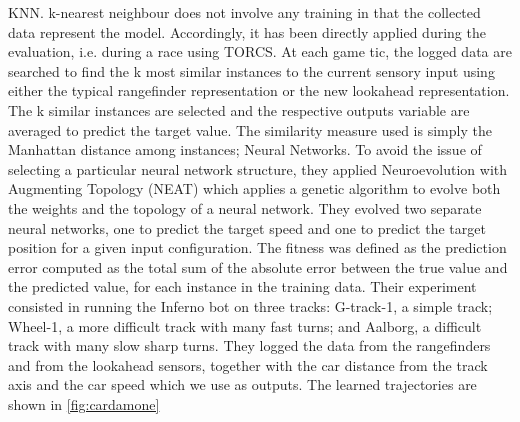 KNN. k-nearest neighbour does not involve any training in that
the collected data represent the model. Accordingly, it has been directly applied during the evaluation, i.e. during a race using TORCS. At each game tic, the logged data are searched to find the k most similar instances to the current sensory input using either the typical rangefinder representation or the new lookahead representation. The k similar instances are selected and the respective outputs variable are averaged to predict the target value. The similarity measure used is simply the Manhattan distance among instances;
Neural Networks. To avoid the issue of selecting a particular neural network structure, they applied Neuroevolution with Augmenting Topology (NEAT) \cite{neat} which applies a genetic algorithm to evolve both the weights and the topology of a neural network. They evolved two separate neural networks, one to predict the target speed and one to predict the target position for a given input configuration. The fitness was defined as the prediction error computed as the total sum of the absolute error between the true value and the predicted value, for each instance in the training data. 
Their experiment consisted in running the Inferno bot on three tracks: G-track-1, a simple track; Wheel-1, a more difficult track with many fast turns; and Aalborg, a difficult track with many slow sharp turns. They logged the data from the rangefinders and from the lookahead sensors, together with the car distance from the track axis and the car speed which we use
as outputs.
The learned trajectories are shown in \ref{fig:cardamone}




